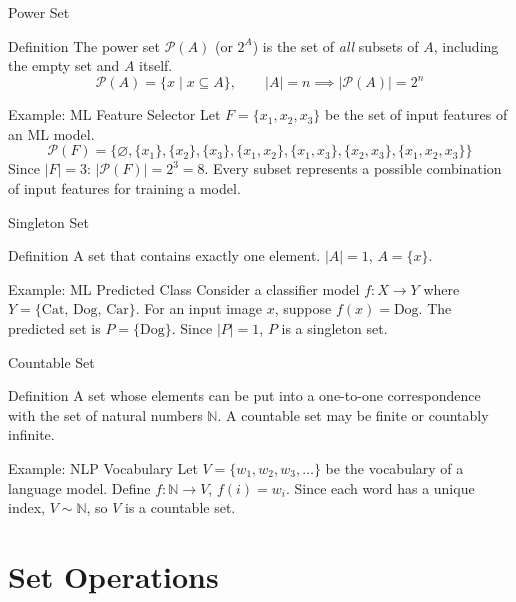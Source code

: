 \documentclass[aspectratio=169]{beamer}
\begin{document}
\begin{frame}{Power Set}
\begin{block}{Definition}
The power set $\mathcal{P}(A)$ (or $2^A$) is the set of \emph{all} subsets of $A$, including the empty set and $A$ itself.
$$\mathcal{P}(A)=\{x \mid x\subseteq A\}, \qquad |A|=n \implies |\mathcal{P}(A)|=2^n$$
\end{block}
\begin{exampleblock}{Example: ML Feature Selector}
Let $F=\{x_1,x_2,x_3\}$ be the set of input features of an ML model.
$$\mathcal{P}(F)=\{\varnothing,\{x_1\},\{x_2\},\{x_3\},\{x_1,x_2\},\{x_1,x_3\},\{x_2,x_3\},\{x_1,x_2,x_3\}\}$$
Since $|F|=3$: $|\mathcal{P}(F)|=2^3=8$. Every subset represents a possible combination of input features for training a model.
\end{exampleblock}
\end{frame}

\begin{frame}{Singleton Set}
\begin{block}{Definition}
A set that contains exactly one element. $|A|=1$, $A=\{x\}$.
\end{block}
\begin{exampleblock}{Example: ML Predicted Class}
Consider a classifier model $f:X\to Y$ where $Y=\{\text{Cat, Dog, Car}\}$. For an input image $x$, suppose $f(x)=\text{Dog}$. The predicted set is $P=\{\text{Dog}\}$. Since $|P|=1$, $P$ is a singleton set.
\end{exampleblock}
\end{frame}

\begin{frame}{Countable Set}
\begin{block}{Definition}
A set whose elements can be put into a one-to-one correspondence with the set of natural numbers $\mathbb{N}$. A countable set may be finite or countably infinite.
\end{block}
\begin{exampleblock}{Example: NLP Vocabulary}
Let $V=\{w_1,w_2,w_3,\dots\}$ be the vocabulary of a language model. Define $f:\mathbb{N}\to V$, $f(i)=w_i$. Since each word has a unique index, $V\sim \mathbb{N}$, so $V$ is a countable set.
\end{exampleblock}
\end{frame}

\section{Set Operations}
\end{document}
